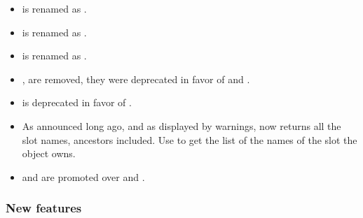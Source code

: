 \begin{itemize}
\item {} is renamed as .

\item {} is renamed as .

\item {} is renamed as .

\item {},  are removed, they were
  deprecated in favor of  and .

\item {} is deprecated in favor of
  .

\item As announced long ago, and as displayed by warnings,
   now returns all the slot names, ancestors
  included.  Use  to get the list of the
  names of the slot the object owns.

\item {} and  are
  promoted over  and .
\end{itemize}

\subsubsection{New features}

